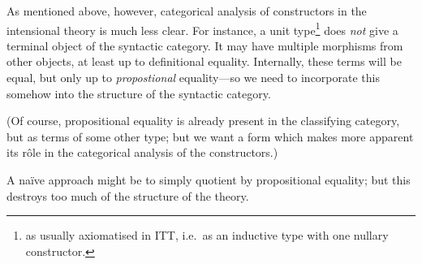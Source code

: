 \begin{para}
As mentioned above, however, categorical analysis of constructors in the intensional theory is much less clear.  For instance, a unit type\footnote{as usually axiomatised in ITT, i.e.\ as an inductive type with one nullary constructor.} does \emph{not} give a terminal object of the syntactic category.  It may have multiple morphisms from other objects, at least up to definitional equality.  Internally, these terms will be equal, but only up to \emph{propostional} equality---so we need to incorporate this somehow into the structure of the syntactic category.  

(Of course, propositional equality is already present in the classifying category, but as terms of some other type; but we want a form which makes more apparent its rôle in the categorical analysis of the constructors.)

A naïve approach might be to simply quotient by propositional equality; but this destroys too much of the structure of the theory. 
\end{para}

